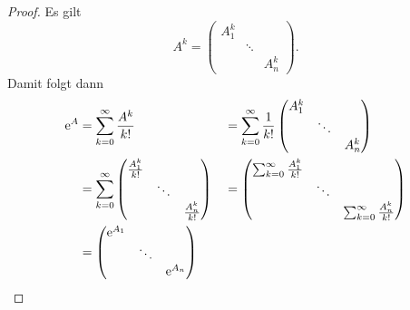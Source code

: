 \begin{proof}
    Es gilt
    \begin{equation*}
        A^k = \begin{pmatrix}
                  A^k_1 &        & \\
                        & \ddots & \\
                        &        & A^k_n
        \end{pmatrix}.
    \end{equation*}
    Damit folgt dann
    \begin{alignat*}{2}
        \mathrm{e}^A
        &= \sum^\infty_{k=0} \frac{A^k}{k!}
            &&= \sum^\infty_{k=0} \frac{1}{k!}
            \begin{pmatrix}
                A^k_1 &        & \\
                      & \ddots & \\
                      &        & A^k_n
            \end{pmatrix}\\
        &= \sum^\infty_{k=0}
            \begin{pmatrix}
                \frac{A^k_1}{k!} &        & \\
                                 & \ddots & \\
                                 &        & \frac{A^k_n}{k!}
            \end{pmatrix}
            &&= \begin{pmatrix}
                    \sum^\infty_{k=0} \frac{A^k_1}{k!} &        & \\
                                                       & \ddots & \\
                                                       &        & \sum^\infty_{k=0} \frac{A^k_n}{k!}
            \end{pmatrix}\\
        &= \begin{pmatrix}
               \mathrm{e}^{A_1} &        & \\
                        & \ddots & \\
                        &        & \mathrm{e}^{A_n}
        \end{pmatrix}
    \end{alignat*}
\end{proof}

